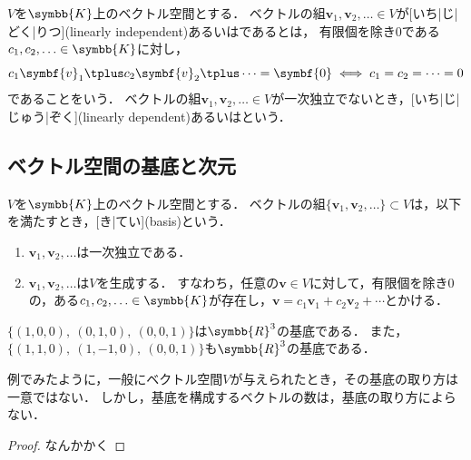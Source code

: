 \documentclass[../sotsu.tex]{subfiles}
\begin{document}
\begin{definition}[一次独立と一次従属]
    \label{dfn:linearly-independent}
    $V$を$\symbb{K}$上のベクトル空間とする．
    ベクトルの組$\symbf{v}_1, \symbf{v}_2, \dotsc \in V$が[いち|じ|どく|りつ](linearly independent)あるいはであるとは，
    有限個を除き$0$である$c_1, c_2, \dotsc \in \symbb{K}$に対し，
    \begin{equation*}
        c_1 \symbf{v}_1 \vecplus c_2 \symbf{v}_2 \vecplus \dotsb = \symbf{0}
        \iff
        c_1 = c_2 = \dots = 0
    \end{equation*}
    であることをいう．
    ベクトルの組$\symbf{v}_1, \symbf{v}_2, \dotsc \in V$が一次独立でないとき，[いち|じ|じゅう|ぞく](linearly dependent)あるいはという．
\end{definition}


\subsection{ベクトル空間の基底と次元}

\begin{definition}[基底]
    \label{dfn:basis}
    $V$を$\symbb{K}$上のベクトル空間とする．
    ベクトルの組$ \{ \symbf{v}_1, \symbf{v}_2, \dotsc \} \subset V$は，以下を満たすとき，[き|てい](basis)という．
    \begin{enumerate}
        \item \label{base:linearly-independent} $\symbf{v}_1, \symbf{v}_2, \dotsc$は一次独立である．
        \item \label{base:spans-V} $\symbf{v}_1, \symbf{v}_2, \dotsc$は$V$を生成する．
            すなわち，任意の$\symbf{v} \in V$に対して，有限個を除き$0$の，ある$c_1, c_2, \dotsc \in \symbb{K}$が存在し，$\symbf{v} = c_1 \symbf{v}_1 + c_2 \symbf{v}_2 + \dotsb$とかける．
    \end{enumerate}
\end{definition}

\begin{example}
    $ \{ (1, 0, 0), \ (0, 1, 0), \ (0, 0, 1) \} $は$\symbb{R}^3$の基底である．
    また，$ \{ (1, 1, 0), \ (1, -1, 0), \ (0, 0, 1) \} $も$\symbb{R}^3$の基底である．
\end{example}

例でみたように，一般にベクトル空間$V$が与えられたとき，その基底の取り方は一意ではない．
しかし，基底を構成するベクトルの数は，基底の取り方によらない．
\begin{proof}
    なんかかく
\end{proof}
\end{document}
